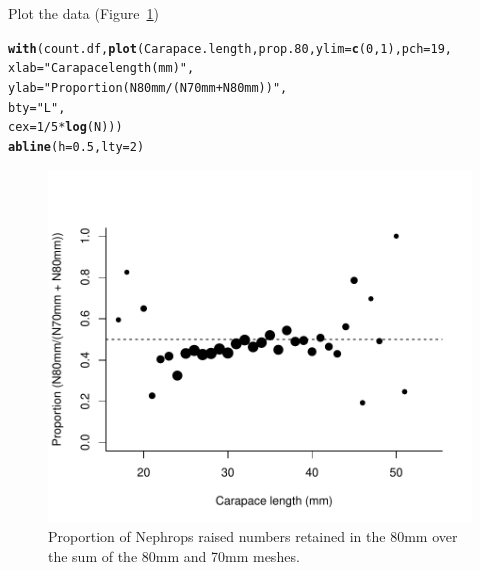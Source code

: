 \documentclass[12pt]{article}\usepackage[]{graphicx}\usepackage[]{color}
\makeatletter
\def\maxwidth{ %
  \ifdim\Gin@nat@width>\linewidth
    \linewidth
  \else
    \Gin@nat@width
  \fi
}
\newcommand{\hlnum}[1]{\textcolor[rgb]{0.686,0.059,0.569}{#1}}%
\newcommand{\hlstr}[1]{\textcolor[rgb]{0.192,0.494,0.8}{#1}}%
\newcommand{\hlopt}[1]{\textcolor[rgb]{0,0,0}{#1}}%
\newcommand{\hlstd}[1]{\textcolor[rgb]{0.345,0.345,0.345}{#1}}%
\newcommand{\hlkwc}[1]{\textcolor[rgb]{0.333,0.667,0.333}{#1}}%
\newcommand{\hlkwd}[1]{\textcolor[rgb]{0.737,0.353,0.396}{\textbf{#1}}}%
\newenvironment{kframe}{%
 \def\at@end@of@kframe{}%
 \ifinner\ifhmode%
  \def\at@end@of@kframe{\end{minipage}}%
  \begin{minipage}{\columnwidth}%
 \fi\fi%
 \def\FrameCommand##1{\hskip\@totalleftmargin \hskip-\fboxsep
 \colorbox{shadecolor}{##1}\hskip-\fboxsep
     \hskip-\linewidth \hskip-\@totalleftmargin \hskip\columnwidth}%
 \MakeFramed {\advance\hsize-\width
   \@totalleftmargin\z@ \linewidth\hsize
   \@setminipage}}%
 {\par\unskip\endMakeFramed%
 \at@end@of@kframe}
\newenvironment{knitrout}{}{} %
\makeatother
\begin{document}
Plot the data (Figure~\ref{fig:rawprops})
\begin{knitrout}\footnotesize
{}\color{fgcolor}\begin{kframe}
\begin{alltt}
\hlkwd{with}\hlstd{(count.df,} \hlkwd{plot}\hlstd{(Carapace.length, prop.80,} \hlkwc{ylim} \hlstd{=} \hlkwd{c}\hlstd{(}\hlnum{0}\hlstd{,} \hlnum{1}\hlstd{),} \hlkwc{pch} \hlstd{=} \hlnum{19}\hlstd{,}
                    \hlkwc{xlab} \hlstd{=} \hlstr{"Carapace length (mm)"}\hlstd{,}
                    \hlkwc{ylab} \hlstd{=} \hlstr{"Proportion (N80mm/(N70mm + N80mm))"}\hlstd{,}
                    \hlkwc{bty} \hlstd{=} \hlstr{"L"}\hlstd{,}
                    \hlkwc{cex} \hlstd{=} \hlnum{1}\hlopt{/}\hlnum{5} \hlopt{*} \hlkwd{log}\hlstd{(N)))}
\hlkwd{abline}\hlstd{(}\hlkwc{h} \hlstd{=} \hlnum{0.5}\hlstd{,} \hlkwc{lty} \hlstd{=} \hlnum{2}\hlstd{)}
\end{alltt}
\end{kframe}\begin{figure}
\includegraphics[width=\maxwidth]{figure/rawprops-1} \caption[Proportion of Nephrops raised numbers retained in the 80mm over the sum of the 80mm and 70mm meshes]{Proportion of Nephrops raised numbers retained in the 80mm over the sum of the 80mm and 70mm meshes.}\label{fig:rawprops}
\end{figure}


\end{knitrout}
\end{document}
